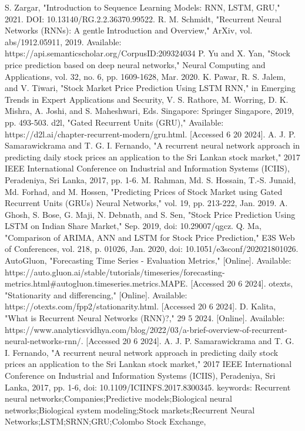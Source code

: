 \documentclass{ieeeojies}
\begin{document}
\begin{thebibliography}{00}
 S. Zargar, "Introduction to Sequence Learning Models: RNN, LSTM, GRU," 2021. DOI: 10.13140/RG.2.2.36370.99522.
 R. M. Schmidt, "Recurrent Neural Networks (RNNs): A gentle Introduction and Overview," ArXiv, vol. abs/1912.05911, 2019. Available: https://api.semanticscholar.org/CorpusID:209324034
 P. Yu and X. Yan, "Stock price prediction based on deep neural networks," Neural Computing and Applications, vol. 32, no. 6, pp. 1609-1628, Mar. 2020.
 K. Pawar, R. S. Jalem, and V. Tiwari, "Stock Market Price Prediction Using LSTM RNN," in Emerging Trends in Expert Applications and Security, V. S. Rathore, M. Worring, D. K. Mishra, A. Joshi, and S. Maheshwari, Eds. Singapore: Springer Singapore, 2019, pp. 493-503.
 d2l, "Gated Recurrent Units (GRU)," Available: https://d2l.ai/chapter-recurrent-modern/gru.html. [Accessed 6 20 2024].
 A. J. P. Samarawickrama and T. G. I. Fernando, "A recurrent neural network approach in predicting daily stock prices an application to the Sri Lankan stock market," 2017 IEEE International Conference on Industrial and Information Systems (ICIIS), Peradeniya, Sri Lanka, 2017, pp. 1-6.
 M. Rahman, Md. S. Hossain, T.-S. Junaid, Md. Forhad, and M. Hossen, "Predicting Prices of Stock Market using Gated Recurrent Units (GRUs) Neural Networks," vol. 19, pp. 213-222, Jan. 2019.
 A. Ghosh, S. Bose, G. Maji, N. Debnath, and S. Sen, "Stock Price Prediction Using LSTM on Indian Share Market," Sep. 2019, doi: 10.29007/qgcz.
 Q. Ma, "Comparison of ARIMA, ANN and LSTM for Stock Price Prediction," E3S Web of Conferences, vol. 218, p. 01026, Jan. 2020, doi: 10.1051/e3sconf/202021801026.
 AutoGluon, "Forecasting Time Series - Evaluation Metrics," [Online]. Available: https://auto.gluon.ai/stable/tutorials/timeseries/forecasting-metrics.html#autogluon.timeseries.metrics.MAPE. [Accessed 20 6 2024].
 otexts, "Stationarity and differencing," [Online]. Available: https://otexts.com/fpp2/stationarity.html. [Accessed 20 6 2024].
 D. Kalita, "What is Recurrent Neural Networks (RNN)?," 29 5 2024. [Online]. Available: https://www.analyticsvidhya.com/blog/2022/03/a-brief-overview-of-recurrent-neural-networks-rnn/. [Accessed 20 6 2024].
 A. J. P. Samarawickrama and T. G. I. Fernando, "A recurrent neural network approach in predicting daily stock prices an application to the Sri Lankan stock market," 2017 IEEE International Conference on Industrial and Information Systems (ICIIS), Peradeniya, Sri Lanka, 2017, pp. 1-6, doi: 10.1109/ICIINFS.2017.8300345. keywords: {Recurrent neural networks;Companies;Predictive models;Biological neural networks;Biological system modeling;Stock markets;Recurrent Neural Networks;LSTM;SRNN;GRU;Colombo Stock Exchange},
\end{thebibliography}
\EOD
\end{document}
